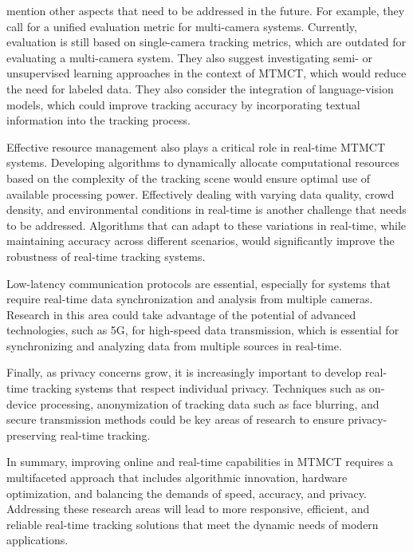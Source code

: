 \textcite{Amosa23} mention other aspects that need to be addressed in the future. For example, they call for a unified evaluation metric for multi-camera systems. Currently, evaluation is still based on single-camera tracking metrics, which are outdated for evaluating a multi-camera system. They also suggest investigating semi- or unsupervised learning approaches in the context of MTMCT, which would reduce the need for labeled data. They also consider the integration of language-vision models, which could improve tracking accuracy by incorporating textual information into the tracking process.

Effective resource management also plays a critical role in real-time MTMCT systems. Developing algorithms to dynamically allocate computational resources based on the complexity of the tracking scene would ensure optimal use of available processing power. Effectively dealing with varying data quality, crowd density, and environmental conditions in real-time is another challenge that needs to be addressed. Algorithms that can adapt to these variations in real-time, while maintaining accuracy across different scenarios, would significantly improve the robustness of real-time tracking systems.

Low-latency communication protocols are essential, especially for systems that require real-time data synchronization and analysis from multiple cameras. Research in this area could take advantage of the potential of advanced technologies, such as 5G, for high-speed data transmission, which is essential for synchronizing and analyzing data from multiple sources in real-time.

Finally, as privacy concerns grow, it is increasingly important to develop real-time tracking systems that respect individual privacy. Techniques such as on-device processing, anonymization of tracking data such as face blurring, and secure transmission methods could be key areas of research to ensure privacy-preserving real-time tracking.

In summary, improving online and real-time capabilities in MTMCT requires a multifaceted approach that includes algorithmic innovation, hardware optimization, and balancing the demands of speed, accuracy, and privacy. Addressing these research areas will lead to more responsive, efficient, and reliable real-time tracking solutions that meet the dynamic needs of modern applications.

